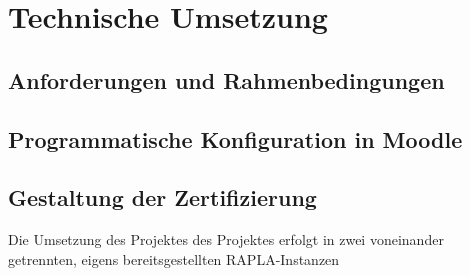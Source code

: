 \chapter{Technische Umsetzung}
\section{Anforderungen und Rahmenbedingungen}
\section{Programmatische Konfiguration in Moodle}
\section{Gestaltung der Zertifizierung}





Die Umsetzung des Projektes des Projektes erfolgt in zwei voneinander getrennten, eigens bereitsgestellten RAPLA-Instanzen